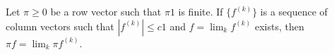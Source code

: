 Let $\pi \geq 0$ be a row vector such that $\pi 1$ is finite. If $\{f^{(k)}\}$ is a sequence of column vectors such that $|f^{(k)}| \leq c1$ and $f = \lim_k f^{(k)}$ exists, then $\pi f = \lim_k \pi f^{(k)}$.
